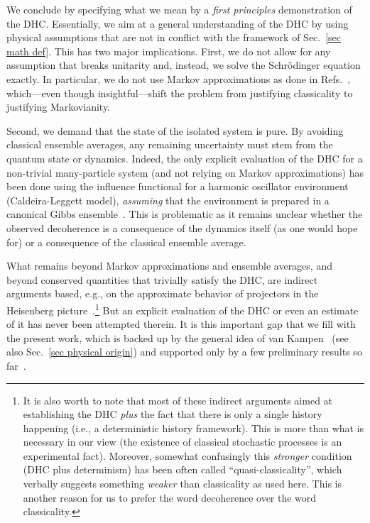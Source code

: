 \documentclass[pre,twocolumn,10pt,aps,longbibliography,nofootinbib]{revtex4-1}
\begin{document}
We conclude by specifying what we mean by a \emph{first principles} demonstration of the DHC. Essentially, we aim at a general understanding of the DHC by using physical assumptions that are not in conflict with the framework of Sec.~\ref{sec math def}. This has two major implications. First, we do not allow for any assumption that breaks unitarity and, instead, we solve the Schr\"odinger equation exactly. In particular, we do not use Markov approximations as done in Refs.~\cite{PazZurekPRD1993, DiosiEtAlPRL1995, BrunPRL1997, YuPA1998, BrunPRA2000, SmirneEtAlQST2018, StrasbergDiazPRA2019, MilzEtAlPRX2020, StrasbergSP2023}, which---even though insightful---shift the problem from justifying classicality to justifying Markovianity.

Second, we demand that the state of the isolated system is pure. By avoiding classical ensemble averages, any remaining uncertainty must stem from the quantum state or dynamics. Indeed, the only explicit evaluation of the DHC for a non-trivial many-particle system (and not relying on Markov approximations) has been done using the influence functional for a harmonic oscillator environment (Caldeira-Leggett model), \emph{assuming} that the environment is prepared in a canonical Gibbs ensemble~\cite{SchmidAP1987, DowkerHalliwellPRD1992, GellMannHartlePRD1993, HalliwellPRD1999, HalliwellPRD2001, SubasiHuPRE2012}. This is problematic as it remains unclear whether the observed decoherence is a consequence of the dynamics itself (as one would hope for) or a consequence of the classical ensemble average.

What remains beyond Markov approximations and ensemble averages, and beyond conserved quantities that trivially satisfy the DHC, are indirect arguments based, e.g., on the approximate behavior of projectors in the Heisenberg picture~\cite{OmnesJSP1989, OmnesRMP1992, GellMannHartlePRD1993, BrunHalliwellPRD1996, HalliwellPRD1998, HalliwellPRL1999, CalzettaHuPRD1999, HalliwellPRD2003, GellMannHartlePRA2007, HalliwellInBook2010}.\footnote{It is also worth to note that most of these indirect arguments aimed at establishing the DHC \emph{plus} the fact that there is only a single history happening (i.e., a deterministic history framework). This is more than what is necessary in our view (the existence of classical stochastic processes is an experimental fact). Moreover, somewhat confusingly this \emph{stronger} condition (DHC plus determinism) has been often called ``quasi-classicality'', which verbally suggests something \emph{weaker} than classicality as used here. This is another reason for us to prefer the word decoherence over the word classicality. } But an explicit evaluation of the DHC or even an estimate of it has never been attempted therein. It is this important gap that we fill with the present work, which is backed up by the general idea of van Kampen~\cite{VanKampenPhys1954} (see also Sec.~\ref{sec physical origin}) and supported only by a few preliminary results so far~\cite{GemmerSteinigewegPRE2014, SchmidtkeGemmerPRE2016, NationPorrasPRE2020, StrasbergEtAlPRA2023, StrasbergSP2023}.
\end{document}
